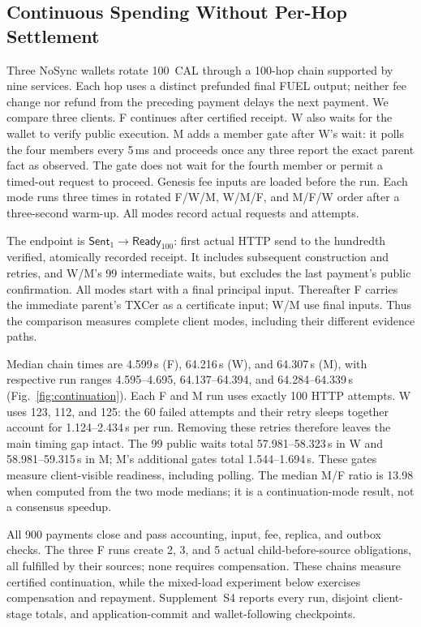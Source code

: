 \subsection{Continuous Spending Without Per-Hop Settlement}
\label{sec:eval-continuation}

Three NoSync wallets rotate 100~CAL through a 100-hop chain supported by
nine services. Each hop uses a distinct prefunded final FUEL output;
neither fee change nor refund from the preceding payment delays the next
payment. We compare three clients. F continues after certified receipt.
W also waits for the wallet to verify public execution. M adds a member
gate after W's wait: it polls the four members every 5\,ms and proceeds
once any three report the exact parent fact as observed. The gate does
not wait for the fourth member or permit a timed-out request to proceed.
Genesis fee inputs are loaded before the run. Each mode runs three times
in rotated F/W/M, W/M/F, and M/F/W order after a three-second warm-up.
All modes record actual requests and attempts.

The endpoint is $\mathsf{Sent}_1\rightarrow\mathsf{Ready}_{100}$:
first actual HTTP send to the hundredth verified, atomically recorded
receipt. It includes subsequent construction and retries, and W/M's 99
intermediate waits, but excludes the last payment's public confirmation.
All modes start with a final principal input. Thereafter F carries the
immediate parent's TXCer as a certificate input; W/M use final inputs.
Thus the comparison measures complete client modes, including their
different evidence paths.

Median chain times are 4.599\,s (F), 64.216\,s (W), and 64.307\,s (M),
with respective run ranges 4.595--4.695, 64.137--64.394, and
64.284--64.339\,s (Fig.~\ref{fig:continuation}). Each F and M run uses
exactly 100 HTTP attempts. W uses 123, 112, and 125: the 60 failed attempts
and their retry sleeps together account for 1.124--2.434\,s per run.
Removing these retries therefore leaves the main timing gap intact.
The 99 public waits total 57.981--58.323\,s in W and
58.981--59.315\,s in M; M's additional gates total 1.544--1.694\,s.
These gates measure client-visible readiness, including polling.
The median M/F ratio is 13.98 when computed from the two mode medians;
it is a continuation-mode result, not a consensus speedup.

All 900 payments close and pass accounting, input, fee, replica, and
outbox checks. The three F runs create 2, 3, and 5 actual
child-before-source obligations, all fulfilled by their sources;
none requires compensation. These chains measure certified continuation,
while the mixed-load experiment below exercises compensation and repayment.
Supplement~S4 reports every run, disjoint client-stage totals, and
application-commit and wallet-following checkpoints.

